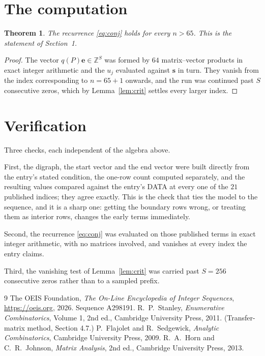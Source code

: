 \documentclass[11pt,a4paper]{article}
\theoremstyle{plain}
\newtheorem{theorem}{Theorem}
\theoremstyle{definition}
\begin{document}
\section{The computation}

\begin{theorem}
The recurrence \eqref{eq:conj} holds for every $n>65$. This is the statement of
Section~1.
\end{theorem}

\begin{proof}
The vector $q(P)\mathbf{e}\in\mathbb{Z}^{S}$ was formed by $64$ matrix--vector
products in exact integer arithmetic and the $u_j$ evaluated against $\mathbf{s}$ in turn.
They vanish from the index corresponding to $n=65+1$ onwards, and the run was continued
past $S$ consecutive zeros, which by Lemma~\ref{lem:crit} settles every larger index.
\end{proof}

\section{Verification}

Three checks, each independent of the algebra above.

First, the digraph, the start vector and the end vector were built directly from the
entry's stated condition, the one-row count computed separately, and the resulting values
compared against the entry's DATA at every one of the $21$ published indices; they
agree exactly. This is the check that ties the model to the sequence, and it is a sharp one:
getting the boundary rows wrong, or treating them as interior rows, changes the early terms
immediately.

Second, the recurrence \eqref{eq:conj} was evaluated on those published terms in exact
integer arithmetic, with no matrices involved, and vanishes at every index the entry claims.

Third, the vanishing test of Lemma~\ref{lem:crit} was carried past $S=256$ consecutive
zeros rather than to a sampled prefix.

\begin{thebibliography}{9}
 The OEIS Foundation, \emph{The On-Line Encyclopedia of Integer
Sequences}, \url{https://oeis.org}, 2026. Sequence A298191.
 R.~P.~Stanley, \emph{Enumerative Combinatorics}, Volume 1, 2nd ed.,
Cambridge University Press, 2011. (Transfer-matrix method, Section 4.7.)
 P.~Flajolet and R.~Sedgewick, \emph{Analytic Combinatorics}, Cambridge
University Press, 2009.
 R.~A.~Horn and C.~R.~Johnson, \emph{Matrix Analysis}, 2nd ed., Cambridge
University Press, 2013.
\end{thebibliography}
\end{document}
